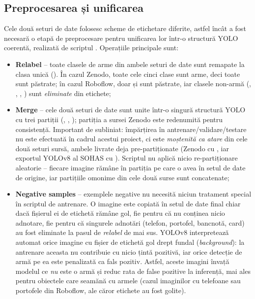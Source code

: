 \documentclass[../../main.tex]{subfiles}
\begin{document}
\subsection{Preprocesarea și unificarea}
\label{subsec:preprocesare_unificare}

Cele două seturi de date folosesc scheme de etichetare diferite, astfel încât a fost necesară o
etapă de preprocesare pentru unificarea lor într-o structură YOLO coerentă, realizată de scriptul
. Operațiile principale sunt:

\begin{itemize}
    \item \textbf{Relabel} -- toate clasele de arme din ambele seturi de date sunt remapate la clasa
    unică  (). În cazul Zenodo, toate cele cinci clase sunt
    arme, deci toate sunt păstrate; în cazul Roboflow, doar  și
     sunt păstrate, iar clasele non-armă (,
    , , ) sunt \textit{eliminate}
    din etichete;
    \item \textbf{Merge} -- cele două seturi de date sunt unite într-o singură structură YOLO cu trei
    partiții (, , ); partiția 
    a sursei Zenodo este redenumită  pentru consistență. Important de subliniat:
    împărțirea în antrenare/validare/testare nu este efectuată în cadrul acestui proiect, ci este
    \textit{moștenită ca atare} din cele două seturi sursă, ambele livrate deja pre-partiționate
    (Zenodo cu , iar exportul YOLOv8 al SOHAS cu ).
    Scriptul nu aplică nicio re-partiționare aleatorie -- fiecare imagine rămâne în partiția pe care
    o avea în setul de date de origine, iar partițiile omonime din cele două surse sunt concatenate;
    \item \textbf{Negative samples} -- exemplele negative nu necesită niciun tratament special
    în scriptul de antrenare. O imagine este copiată în setul de date final chiar dacă fișierul ei de
    etichetă rămâne gol, fie pentru că nu conținea nicio adnotare, fie pentru că singurele adnotări
    (telefon, portofel, bancnotă, card) au fost eliminate la pasul de \textit{relabel} de mai sus.
    YOLOv8 interpretează automat orice imagine cu fișier de etichetă gol drept fundal
    (\textit{background}): la antrenare aceasta nu contribuie cu nicio țintă pozitivă, iar orice
    detecție de armă pe ea este penalizată ca fals pozitiv. Astfel, aceste imagini învață modelul
    ce \textit{nu} este o armă și reduc rata de false pozitive la inferență, mai ales pentru
    obiectele care seamănă cu armele (cazul imaginilor cu telefoane sau portofele din Roboflow,
    ale căror etichete au fost golite).
\end{itemize}
\end{document}

